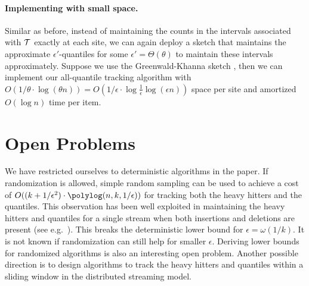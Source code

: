\documentclass[10pt]{article}
\newcommand{\eps}{\epsilon}
\begin{document}
\paragraph{Implementing with small space.}
Similar as before, instead of maintaining the counts in the intervals
associated with $\mathcal{T}$ exactly at each site, we can again deploy a sketch
that maintains the approximate $\eps'$-quantiles for some
$\eps'=\Theta(\theta)$ to maintain these intervals approximately.  Suppose
we use the Greenwald-Khanna sketch \cite{greenwald01:_space}, then we can
implement our all-quantile tracking algorithm with $O(1/\theta\cdot
\log(\theta n)) = O(1/\eps \cdot \log\frac{1}{\eps}\log(\eps n))$ space per
site and amortized $O(\log n)$ time per item.


 
\section{Open Problems}
We have restricted ourselves to deterministic algorithms in the paper.  If
randomization is allowed, simple random sampling can be used to achieve a
cost of $O((k+1/\eps^2)\cdot \polylog(n,k,1/\eps))$ for tracking both the
heavy hitters and the quantiles.  This observation has been well exploited
in maintaining the heavy hitters and quantiles for a single stream when
both insertions and deletions are present (see e.g.\
\cite{gilbert02:_how}).  This breaks the deterministic lower bound for
$\eps = \omega(1/k)$.  It is not known if randomization can still help for
smaller $\eps$.  Deriving lower bounds for randomized algorithms is also an
interesting open problem.  Another possible direction is to design
algorithms to track the heavy hitters and quantiles within a sliding window
in the distributed streaming model.
\end{document}
